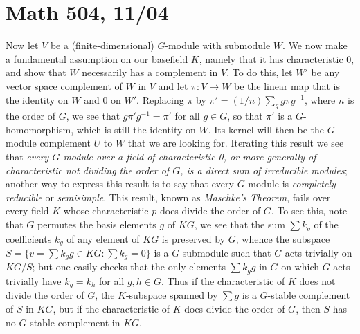 \documentclass[10pt]{article}
\begin{document}
\section*{Math 504, 11/04}

Now let $V$ be a (finite-dimensional) $G$-module with submodule $W$. We
now make a fundamental assumption on our basefield $K$, namely that it
has characteristic 0, and show that $W$ necessarily has a complement in
$V$. To do this, let $W'$ be any vector space complement of $W$ in $V$
and let $\pi:V\rightarrow W$ be the linear map that is the identity on
$W$ and 0 on $W'$. Replacing $\pi$ by $\pi' = (1/n) \sum_g g\pi g^{-1}$,
where $n$ is the order of $G$, we see that $g\pi' g^{-1} = \pi'$ for all
$g\in G$, so that $\pi'$ is a $G$-homomorphism, which is still the
identity on $W$. Its kernel will then be the $G$-module complement $U$
to $W$ that we are looking for. Iterating this result we see that {\sl
  every $G$-module over a field of characteristic 0, or more generally
  of characteristic not dividing the order of $G$, is a direct sum of
  irreducible modules}; another way to express this result is to say
that every $G$-module is {\sl completely reducible} or {\sl semisimple}.
This result, known as {\sl Maschke's Theorem}, fails over every field
$K$ whose characteristic $p$ does divide the order of $G$. To see this,
note that $G$ permutes the basis elements $g$ of $KG$, we see that the
sum $\sum k_g$ of the coefficients $k_g$ of any element of $KG$ is
preserved by $G$, whence the subspace $S = \{v = \sum k_g g \in KG: \sum
k_g = 0\}$ is a $G$-submodule such that $G$ acts trivially on $KG/S$;
but one easily checks that the only elements $\sum k_g g$ in $G$ on
which $G$ acts trivially have $k_g = k_h$ for all $g,h\in G$. Thus if
the characteristic of $K$ does not divide the order of $G$, the
$K$-subspace spanned by $\sum g$ is a $G$-stable complement of $S$ in
$KG$, but if the characteristic of $K$ does divide the order of $G$,
then $S$ has no $G$-stable complement in $KG$.
\end{document}
